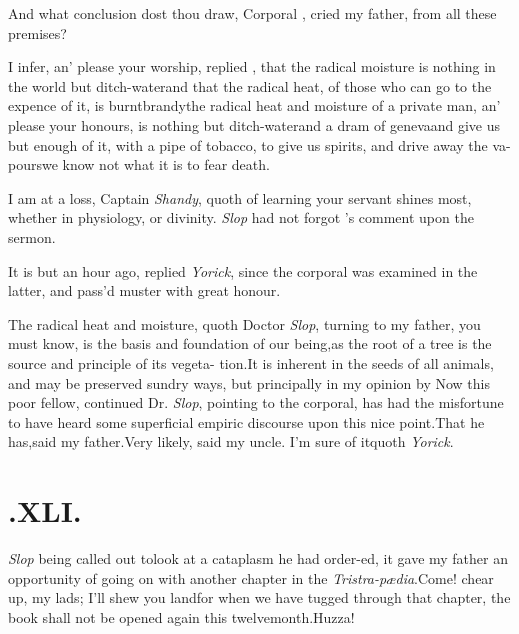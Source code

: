 \documentclass[twoside]{article}
\begin{document}
And what conclusion dost thou draw, Corporal \trim, cried
my father, from all these premises?

I infer, an’ please your worship, re\-plied \trim,
that the radical moisture is nothing in the world but
ditch-water\tsh\break and that the radical heat, of those who can go to
the expence of it, is burnt\break brandy\tsk the radical heat and
moisture of a private man, an’ please your honours, is nothing
but ditch-water\tsk and a dram of geneva\tsh and give us
but enough of it, with a pipe of tobacco, to give us spirits, and
drive away the va- pours\tsk we know not what it is to fear
death.

I am at a loss, Captain \textit{Shandy}, quoth 
of learning your servant shines most,\break
whether in physiology, or divinity.\tsk\break
\textit{Slop} had not forgot \trim's comment\break
upon the sermon.\tsk

It is but an hour ago, replied \textit{Yorick}, since the corporal
was examined in the latter, and pass’d muster with great\break
honour.\tsh

The radical heat and moisture, quoth Doctor \textit{Slop}, turning
to my father, you must know, is the basis and foundation of our
being,\tsk as the root of a tree is the source and principle of
its vegeta-
tion.\tsk It is inherent in the seeds of all animals, and may be
preserved sundry ways, but principally in my opinion by
\tsh Now this poor fellow, continued Dr.\@
\textit{Slop}, pointing to the corporal, has had the misfortune
to have heard some superficial empiric discourse upon this nice
point.\tsh That he has,\tsk said my father.\tsh Very likely,
said my uncle.\break
\tsk I’m sure of it\tsk quoth \textit{Yorick}.\tsh

\smallskip

\section{.\enspace  XLI.}

 \textit{Slop} being called out
to\break look at a cataplasm he had order-\break ed, it gave my father an
opportunity of going on with another chapter in the\break
\textit{Tristra-pædia}.\tsh Come! chear up, my 
lads; I’ll shew you land\tsh for when\break
we have tugged through that chapter,\break
the book shall not be opened again this\break
twelvemonth.\tsk Huzza!\tsk
\end{document}

